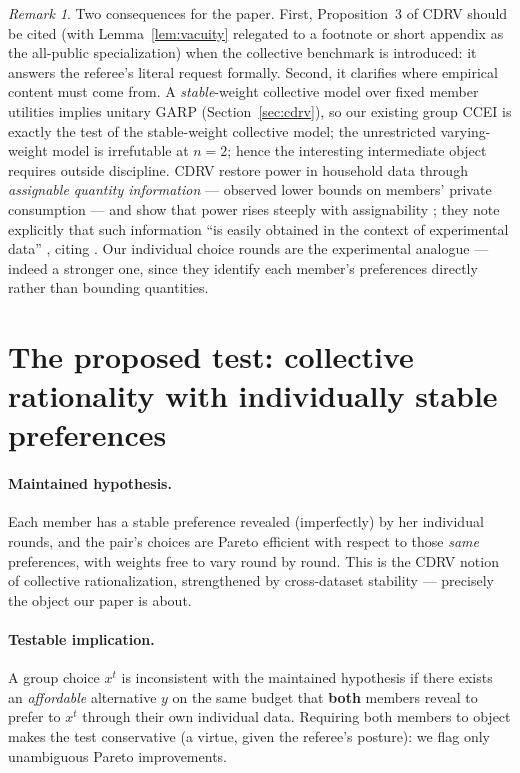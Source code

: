 \documentclass[11pt]{article}
\theoremstyle{remark}
\newtheorem{remark}{Remark}
\begin{document}
\begin{remark}\label{rem:content}
Two consequences for the paper. First, Proposition~3 of CDRV should be cited (with Lemma~\ref{lem:vacuity} relegated to a footnote or short appendix as the all-public specialization) when the collective benchmark is introduced: it answers the referee's literal request formally. Second, it clarifies where empirical content must come from. A \emph{stable}-weight collective model over fixed member utilities implies unitary GARP (Section~\ref{sec:cdrv}), so our existing group CCEI is exactly the test of the stable-weight collective model; the unrestricted varying-weight model is irrefutable at $n=2$; hence the interesting intermediate object requires outside discipline. CDRV restore power in household data through \emph{assignable quantity information} --- observed lower bounds on members' private consumption --- and show that power rises steeply with assignability \citep[Sec.~4.2, Table~2]{cherchye2011}; they note explicitly that such information ``is easily obtained in the context of experimental data'' \citep[p.~185]{cherchye2011}, citing \citet{bruyneel2008}. Our individual choice rounds are the experimental analogue --- indeed a stronger one, since they identify each member's preferences directly rather than bounding quantities.
\end{remark}

\section{The proposed test: collective rationality with individually stable preferences}\label{sec:test}

\paragraph{Maintained hypothesis.}
Each member has a stable preference revealed (imperfectly) by her individual rounds, and the pair's choices are Pareto efficient with respect to those \emph{same} preferences, with weights free to vary round by round. This is the CDRV notion of collective rationalization, strengthened by cross-dataset stability --- precisely the object our paper is about.

\paragraph{Testable implication.}
A group choice $x^t$ is inconsistent with the maintained hypothesis if there exists an \emph{affordable} alternative $y$ on the same budget that \textbf{both} members reveal to prefer to $x^t$ through their own individual data. Requiring both members to object makes the test conservative (a virtue, given the referee's posture): we flag only unambiguous Pareto improvements.
\end{document}
